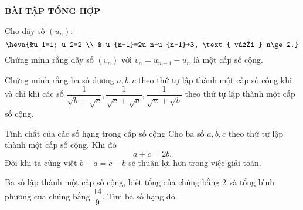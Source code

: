 \begin{center}
	\textbf{BÀI TẬP TỔNG HỢP}
\end{center}

\begin{bt}%
	Cho dãy số $(u_n)$:
	$$\heva{&u_1=1; u_2=2 \\ & u_{n+1}=2u_n-u_{n-1}+3, \text{ với } n\ge 2.}$$
	Chứng minh rằng dãy số $(v_n)$ với $v_n=u_{n+1}-u_n$ là một cấp số cộng.
\end{bt}

\begin{bt}%
	Chứng minh rằng ba số dương $a, b, c$ theo thứ tự lập thành một cấp số cộng khi và chỉ khi các số $\dfrac{1}{\sqrt{b}+\sqrt{c}}, \dfrac{1}{\sqrt{c}+\sqrt{a}}, \dfrac{1}{\sqrt{a}+\sqrt{b}}$ theo thứ tự lập thành một cấp số cộng.
\end{bt}





\begin{dang}{Tính chất của các số hạng trong cấp số cộng}
	Cho ba số $a,b,c$ theo thứ tự lập thành một cấp số cộng. Khi đó $$a+c=2b.$$
	Đôi khi ta cũng viết $b-a=c-b$ sẽ thuận lợi hơn trong việc giải toán.
\end{dang}
\begin{vd}%
	Ba số lập thành một cấp số cộng, biết tổng của chúng bằng $2$ và tổng bình phương của chúng bằng $\dfrac{14}{9}$. Tìm ba số hạng đó.
\end{vd}


